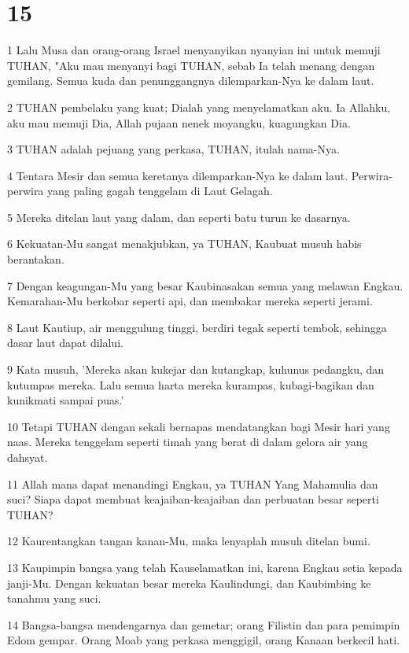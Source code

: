 \chapter{15}

\par 1 Lalu Musa dan orang-orang Israel menyanyikan nyanyian ini untuk memuji TUHAN, "Aku mau menyanyi bagi TUHAN, sebab Ia telah menang dengan gemilang. Semua kuda dan penunggangnya dilemparkan-Nya ke dalam laut.
\par 2 TUHAN pembelaku yang kuat; Dialah yang menyelamatkan aku. Ia Allahku, aku mau memuji Dia, Allah pujaan nenek moyangku, kuagungkan Dia.
\par 3 TUHAN adalah pejuang yang perkasa, TUHAN, itulah nama-Nya.
\par 4 Tentara Mesir dan semua keretanya dilemparkan-Nya ke dalam laut. Perwira-perwira yang paling gagah tenggelam di Laut Gelagah.
\par 5 Mereka ditelan laut yang dalam, dan seperti batu turun ke dasarnya.
\par 6 Kekuatan-Mu sangat menakjubkan, ya TUHAN, Kaubuat musuh habis berantakan.
\par 7 Dengan keagungan-Mu yang besar Kaubinasakan semua yang melawan Engkau. Kemarahan-Mu berkobar seperti api, dan membakar mereka seperti jerami.
\par 8 Laut Kautiup, air menggulung tinggi, berdiri tegak seperti tembok, sehingga dasar laut dapat dilalui.
\par 9 Kata musuh, 'Mereka akan kukejar dan kutangkap, kuhunus pedangku, dan kutumpas mereka. Lalu semua harta mereka kurampas, kubagi-bagikan dan kunikmati sampai puas.'
\par 10 Tetapi TUHAN dengan sekali bernapas mendatangkan bagi Mesir hari yang naas. Mereka tenggelam seperti timah yang berat di dalam gelora air yang dahsyat.
\par 11 Allah mana dapat menandingi Engkau, ya TUHAN Yang Mahamulia dan suci? Siapa dapat membuat keajaiban-keajaiban dan perbuatan besar seperti TUHAN?
\par 12 Kaurentangkan tangan kanan-Mu, maka lenyaplah musuh ditelan bumi.
\par 13 Kaupimpin bangsa yang telah Kauselamatkan ini, karena Engkau setia kepada janji-Mu. Dengan kekuatan besar mereka Kaulindungi, dan Kaubimbing ke tanahmu yang suci.
\par 14 Bangsa-bangsa mendengarnya dan gemetar; orang Filistin dan para pemimpin Edom gempar. Orang Moab yang perkasa menggigil, orang Kanaan berkecil hati.
